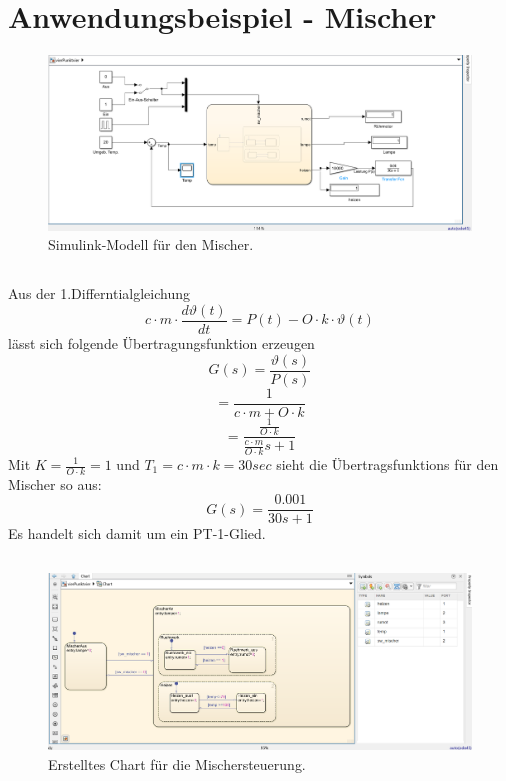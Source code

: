 \documentclass{article}
\begin{document}
	\section{Anwendungsbeispiel - Mischer}
		\begin{figure}[h]
			\centering
			\includegraphics[scale=0.5]{Aufgabe4.4a.png}
			\caption{Simulink-Modell für den Mischer.}
			\label{fig_12: Aufg_4a_SimulinkModell}
		\end{figure}
		\subsection{}
			Aus der 1.Differntialgleichung
			$$c\cdot m \cdot \frac{d\vartheta(t)}{dt}= P(t) - O\cdot k \cdot \vartheta(t) $$
			lässt sich folgende Übertragungsfunktion erzeugen
			$$G(s) = \frac{\vartheta (s)}{P(s)}$$
			$$ = \frac{1}{c\cdot m + O\cdot k} $$
			$$ = \frac{\frac{1}{O\cdot k}}{\frac{c\cdot m}{O\cdot k}s + 1}$$
			Mit $K=\frac{1}{O\cdot k} = 1$ und $T_1 = c\cdot m \cdot k = 30 sec$ sieht die Übertragsfunktions für den Mischer so aus:
			$$G(s) = \frac{0.001}{30s + 1}$$
			Es handelt sich damit um ein PT-1-Glied.
\clearpage
		\subsection{}
			\begin{figure}[h]
				\centering
				\includegraphics[scale=0.5]{Aufgabe4.4Chart.png}
				\caption{Erstelltes Chart für die Mischersteuerung.}
				\label{fig_13: Aufg_4b_Mischer}
			\end{figure}
\end{document}
